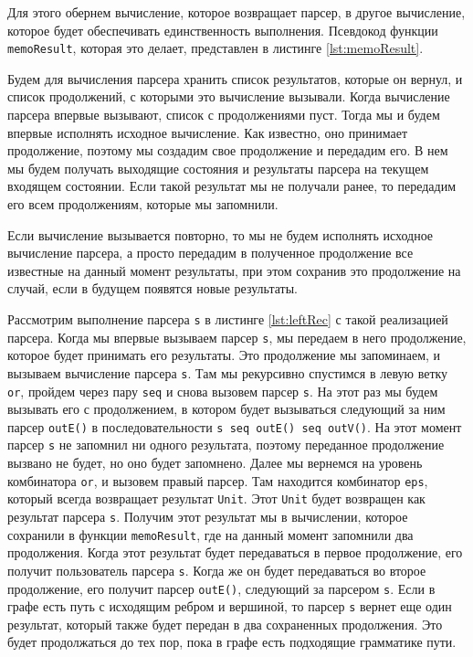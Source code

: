 Для этого обернем вычисление, которое возвращает парсер, в другое вычисление, которое будет обеспечивать единственность выполнения.
Псевдокод функции \texttt{memoResult}, которая это делает, представлен в листинге \ref{lst:memoResult}.

Будем для вычисления парсера хранить список результатов, которые он вернул, и список продолжений, с которыми это вычисление вызывали. Когда вычисление парсера впервые вызывают, список с продолжениями пуст. Тогда мы и будем впервые исполнять исходное вычисление. Как известно, оно принимает продолжение, поэтому мы создадим свое продолжение и передадим его. В нем мы будем получать выходящие состояния и результаты парсера на текущем входящем состоянии. Если такой результат мы не получали ранее, то передадим его всем продолжениям, которые мы запомнили.

Если вычисление вызывается повторно, то мы не будем исполнять исходное вычисление парсера, а просто передадим в полученное продолжение все известные на данный момент результаты, при этом сохранив это продолжение на случай, если в будущем появятся новые результаты.

Рассмотрим выполнение парсера \texttt{s} в листинге \ref{lst:leftRec} с такой реализацией парсера.
Когда мы впервые вызываем парсер \texttt{s}, мы передаем в него продолжение, которое будет принимать его результаты.
Это продолжение мы запоминаем, и вызываем вычисление парсера \texttt{s}.
Там мы рекурсивно спустимся в левую ветку \texttt{or}, пройдем через пару \texttt{seq} и снова вызовем парсер \texttt{s}.
На этот раз мы будем вызывать его с продолжением, в котором будет вызываться следующий за ним парсер \texttt{outE()} в последовательности \texttt{s seq outE() seq outV()}.
На этот момент парсер \texttt{s} не запомнил ни одного результата, поэтому переданное продолжение вызвано не будет, но оно будет запомнено.
Далее мы вернемся на уровень комбинатора \texttt{or}, и вызовем правый парсер.
Там находится комбинатор \texttt{eps}, который всегда возвращает результат \texttt{Unit}.
Этот \texttt{Unit} будет возвращен как результат парсера \texttt{s}.
Получим этот результат мы в вычислении, которое сохранили в функции \texttt{memoResult}, где на данный момент запомнили два продолжения.
Когда этот результат будет передаваться в первое продолжение, его получит пользователь парсера \texttt{s}.
Когда же он будет передаваться во второе продолжение, его получит парсер \texttt{outE()}, следующий за парсером \texttt{s}.
Если в графе есть путь с исходящим ребром и вершиной, то парсер \texttt{s} вернет еще один результат, который также будет передан в два сохраненных продолжения.
Это будет продолжаться до тех пор, пока в графе есть подходящие грамматике пути.

